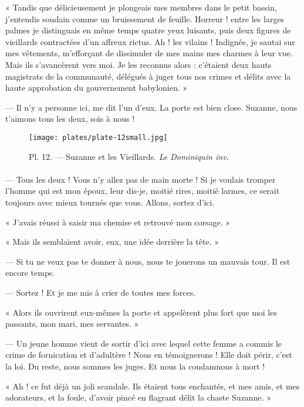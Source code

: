 \documentclass[a4paper, 11pt, oneside, polutonikogreek, french]{article}
\begin{document}
« Tandis que délicieusement je plongeais mes membres dans le petit bassin, j'entendis soudain comme un bruissement de feuille. Horreur ! entre les larges palmes je distinguais en même temps quatre yeux luisants, puis deux figures de vieillards contractées d'un affreux rictus. Ah ! les vilains ! Indignée, je sautai sur mes vêtements, m'efforçant de dissimuler de mes mains mes charmes à leur vue. Mais ils s'avancèrent vers moi. Je les reconnus alors : c'étaient deux hauts magistrats de la communauté, délégués à juger tous nos crimes et délits avec la haute approbation du gouvernement babylonien. »

--- Il n'y a personne ici, me dit l'un d'eux. La porte est bien close. Suzanne, nous t'aimons tous les deux, sois à nous !
\clearpage
\vspace*{\fill}
\begin{figure}[H]
\centering
\texttt{[image: plates/plate-12small.jpg]}
\caption{Pl. 12. --- Suzanne et les Vieillards. \emph{Le Dominiquin inv.}}
\end{figure}
\vspace*{\fill}
\clearpage
\paragraph{}
--- Tous les deux ! Vous n'y allez pas de main morte ! Si je voulais tromper l'homme qui est mon époux, leur dis-je, moitié rires, moitié larmes, ce serait toujours avec mieux tournés que vous. Allons, sortez d'ici.

« J'avais réussi à saisir ma chemise et retrouvé mon corsage. »

« Mais ils semblaient avoir, eux, une idée derrière la tête. »

--- Si tu ne veux pas te donner à nous, nous te jouerons un mauvais tour. Il est encore temps.

--- Sortez ! Et je me mis à crier de toutes mes forces.

« Alors ils ouvrirent eux-mêmes la porte et appelèrent plus fort que moi les passants, mon mari, mes servantes. »

--- Un jeune homme vient de sortir d'ici avec lequel cette femme a commis le crime de fornication et d'adultère ! Nous en témoignerons ! Elle doit périr, c'est la loi. Du reste, nous sommes les juges. Et nous la condamnons à mort !

« Ah ! ce fut déjà un joli scandale. Ils étaient tous enchantés, et mes amis, et mes adorateurs, et la foule, d'avoir pincé en flagrant délit la chaste Suzanne. »
\end{document}
